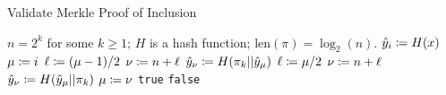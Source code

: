 \begin{algorithm}[p]
\caption{Validate Merkle Proof of Inclusion}
\label{alg:merkle_proof}
\begin{algorithmic}[1]
\Require $n = 2^{k}$ for some $k\ge1$; $H$ is a \gls{hash function}; $\text{len}(\pi) = \log_{2}(n)$.
    \State $\hat{y}_{i} \coloneqq{} H(x)$
    \State $\mu \coloneqq{} i$
            \State $\ell \coloneqq{} (\mu-1)/2$
            \State $\nu \coloneqq{} n + \ell$
            \State $\hat{y}_{\nu} \coloneqq{} H(\pi_{k}||\hat{y}_{\mu})$
        \Else
            \State $\ell \coloneqq{} \mu/2$
            \State $\nu \coloneqq{} n + \ell$
            \State $\hat{y}_{\nu} \coloneqq{} H(\hat{y}_{\mu}||\pi_{k})$
        \EndIf
        \State $\mu \coloneqq{} \nu$
    \EndFor
        \State \Return \texttt{true}
    \Else
        \State \Return \texttt{false}
    \EndIf
\EndProcedure
\end{algorithmic}
\end{algorithm}
